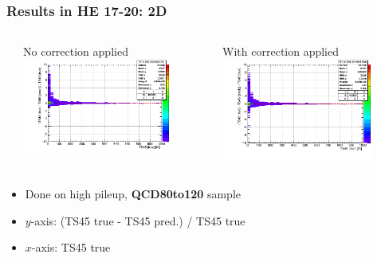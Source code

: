 \documentclass[bigger]{beamer}
\providecommand{\alert}[1]{\textbf{#1}}
\begin{document}
\begin{frame}
\frametitle{Results in HE 17-20: 2D}
\label{sec-3-3-5}
\begin{columns} %
\label{sec-3-3-5-1}
\begin{column}{0.55\textwidth}
\label{sec-3-3-5-1-1}

\centering
No correction applied
\includegraphics[width=0.8\textwidth]{fig/delta_uncorrected_QCD80to120_ring_1.png}
\end{column}
\begin{column}{0.55\textwidth}
\label{sec-3-3-5-1-2}

\centering
With correction applied
\includegraphics[width=0.8\textwidth]{fig/delta_corrected_QCD80to120_ring_1.png}
\end{column}
\end{columns}
\label{sec-3-3-5-2}
\begin{itemize}

\item Done on high pileup, \alert{QCD80to120} sample
\label{sec-3-3-5-2-1}%

\item $y$-axis: (TS45 true - TS45 pred.) / TS45 true
\label{sec-3-3-5-2-2}%

\item $x$-axis: TS45 true
\label{sec-3-3-5-2-3}%

\end{itemize} %
\end{frame}
\end{document}
